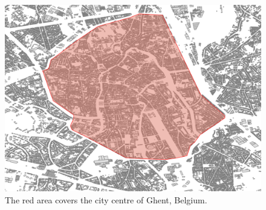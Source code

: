 \begin{figure}[!h]
  \includegraphics[width=\textwidth]{../images/cityCenterGhent.png}
\caption{The red area covers the city centre of Ghent, Belgium.}
  \label{fig:ghent}
\end{figure}


